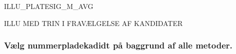 ILLU\_PLATESIG\_M\_AVG



ILLU MED TRIN I FRAVÆLGELSE AF KANDIDATER







\subsubsection{Vælg nummerpladekadidt på baggrund af alle metoder.}



